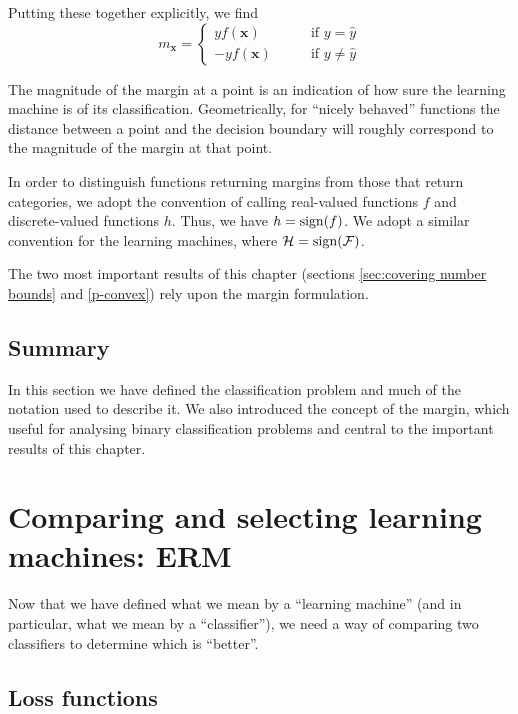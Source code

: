 Putting these together explicitly, we find
%
\begin{equation}
m_{\mathbf{x}} = \left\{ \begin{array}{rl}
yf(\mathbf{x})	& \qquad \mbox{if $y = \hat{y}$} \\
-yf(\mathbf{x})	& \qquad \mbox{if $y \neq \hat{y}$}
\end{array} \right.
\label{eqn:margin definition}
\end{equation}

The magnitude of the margin at a point is an indication of how sure the
learning machine is of its classification.  Geometrically, for
``nicely behaved'' functions the distance between a point and the
decision boundary will roughly correspond to the magnitude of the
margin at that point.

In order to distinguish functions returning margins from those that
return categories, we adopt the convention of calling real-valued
functions $f$ and discrete-valued functions $h$.  Thus, we have $h =
\mathrm{sign}(f)$.  We adopt a similar convention for the learning machines,
where $\mathcal{H} = \mathrm{sign}(\mathcal{F})$.

The two most important results of this chapter (sections
\ref{sec:covering number bounds} and \ref{p-convex}) rely upon the
margin formulation.



\subsection{Summary}

In this section we have defined the classification problem and much of
the notation used to describe it.  We also introduced the concept of
the margin, which useful for analysing binary classification
problems and central to the important results of this chapter.



\section{Comparing and selecting learning machines: ERM}
\label{sec:erm}

Now that we have defined what we mean by a ``learning machine'' (and
in particular, what we mean by a ``classifier''), we need a way of
comparing two classifiers to determine which is ``better''.


\subsection{Loss functions}
\label{sec:loss function}

